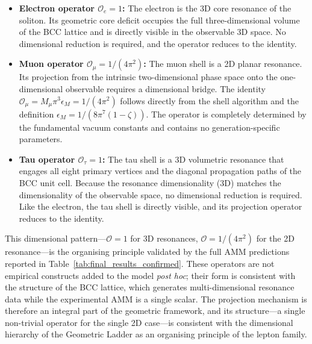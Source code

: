 \documentclass[10pt,a4paper]{article}
\begin{document}
\begin{itemize}
	\item \textbf{Electron operator $\mathcal{O}_e = 1$:} The electron is the 3D core resonance of the soliton. Its geometric core deficit occupies the full three-dimensional volume of the BCC lattice and is directly visible in the observable 3D space. No dimensional reduction is required, and the operator reduces to the identity.
	
	\item \textbf{Muon operator $\mathcal{O}_\mu = 1/(4\pi^2)$:} The muon shell is a 2D planar resonance. Its projection from the intrinsic two-dimensional phase space onto the one-dimensional observable requires a dimensional bridge. The identity $\mathcal{O}_\mu = M_\mu \pi^3 \epsilon_M = 1/(4\pi^2)$ follows directly from the shell algorithm and the definition $\epsilon_M = 1/(8\pi^7(1-\zeta))$. The operator is completely determined by the fundamental vacuum constants and contains no generation-specific parameters.
	
	\item \textbf{Tau operator $\mathcal{O}_\tau = 1$:} The tau shell is a 3D volumetric resonance that engages all eight primary vertices and the diagonal propagation paths of the BCC unit cell. Because the resonance dimensionality (3D) matches the dimensionality of the observable space, no dimensional reduction is required. Like the electron, the tau shell is directly visible, and its projection operator reduces to the identity.
\end{itemize}

This dimensional pattern---$\mathcal{O} = 1$ for 3D resonances, $\mathcal{O} = 1/(4\pi^2)$ for the 2D resonance---is the organising principle validated by the full AMM predictions reported in Table~\ref{tab:final_results_confirmed}. These operators are not empirical constructs added to the model \textit{post hoc}; their form is consistent with the structure of the BCC lattice, which generates multi-dimensional resonance data while the experimental AMM is a single scalar. The projection mechanism is therefore an integral part of the geometric framework, and its structure---a single non-trivial operator for the single 2D case---is consistent with the dimensional hierarchy of the Geometric Ladder as an organising principle of the lepton family.
\end{document}
